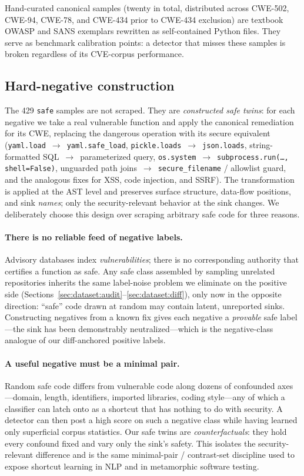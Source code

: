 Hand-curated canonical samples (twenty in total, distributed
across CWE-502, CWE-94, CWE-78, and CWE-434 prior to CWE-434
exclusion) are textbook OWASP and SANS exemplars rewritten as
self-contained Python files. They serve as benchmark calibration
points: a detector that misses these samples is broken regardless
of its CVE-corpus performance.

\subsection{Hard-negative construction}
\label{sec:dataset:hardneg}

The 429 \texttt{safe} samples are not scraped. They are
\emph{constructed safe twins}: for each negative we take a real
vulnerable function and apply the canonical remediation for its CWE,
replacing the dangerous operation with its secure equivalent
(\texttt{yaml.load}~$\rightarrow$~\texttt{yaml.safe\_load},
\texttt{pickle.loads}~$\rightarrow$~\texttt{json.loads},
string-formatted SQL~$\rightarrow$~parameterized query,
\texttt{os.system}~$\rightarrow$~\texttt{subprocess.run(\ldots,
shell=False)}, unguarded path joins~$\rightarrow$~\texttt{secure\_filename}
/ allowlist guard, and the analogous fixes for XSS, code injection,
and SSRF). The transformation is applied at the AST level and
preserves surface structure, data-flow positions, and sink
\emph{names}; only the security-relevant behavior at the sink
changes. We deliberately choose this design over scraping arbitrary
safe code for three reasons.

\paragraph{There is no reliable feed of negative labels.} Advisory
databases index \emph{vulnerabilities}; there is no corresponding
authority that certifies a function as safe. Any safe class assembled
by sampling unrelated repositories inherits the same label-noise
problem we eliminate on the positive side (Sections~\ref{sec:dataset:audit}--\ref{sec:dataset:diff}),
only now in the opposite direction: ``safe'' code drawn at random may
contain latent, unreported sinks. Constructing negatives from a known
fix gives each negative a \emph{provable} safe label---the sink has
been demonstrably neutralized---which is the negative-class analogue
of our diff-anchored positive labels.

\paragraph{A useful negative must be a minimal pair.} Random safe code
differs from vulnerable code along dozens of confounded axes---domain,
length, identifiers, imported libraries, coding style---any of which a
classifier can latch onto as a shortcut that has nothing to do with
security. A detector can then post a high score on such a negative
class while having learned only superficial corpus statistics. Our
safe twins are \emph{counterfactuals}: they hold every confound fixed
and vary only the sink's safety. This isolates the security-relevant
difference and is the same minimal-pair / contrast-set discipline used
to expose shortcut learning in NLP and in metamorphic software
testing.

